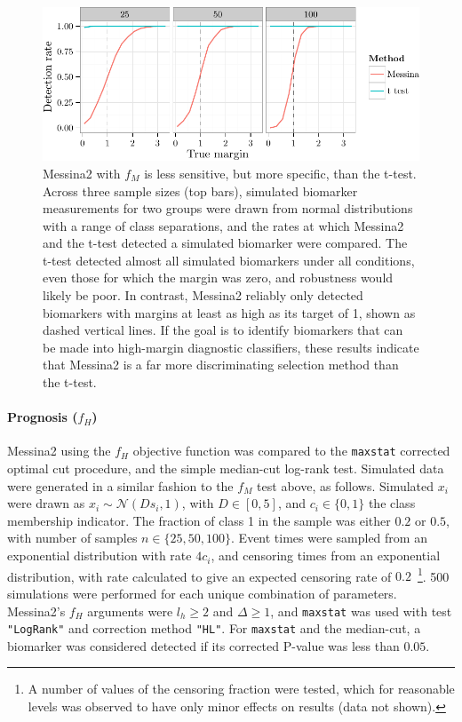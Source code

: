 \documentclass[dissertation.tex]{subfiles}
\begin{document}
\begin{figure}[!htbp]
\centering
\includegraphics[width=\linewidth]{analysis/messina/figure/06-E2A-E2A-plots-1}
\caption[Messina2 $f_M$ selects only desired biomarkers]{Messina2 with $f_M$ is less sensitive, but more specific, than the t-test.  Across three sample sizes (top bars), simulated biomarker measurements for two groups were drawn from normal distributions with a range of class separations, and the rates at which Messina2 and the t-test detected a simulated biomarker were compared.  The t-test detected almost all simulated biomarkers under all conditions, even those for which the margin was zero, and robustness would likely be poor.  In contrast, Messina2 reliably only detected biomarkers with margins at least as high as its target of 1, shown as dashed vertical lines.  If the goal is to identify biomarkers that can be made into high-margin diagnostic classifiers, these results indicate that Messina2 is a far more discriminating selection method than the t-test.}\label{fig:mess-vs-t}
\end{figure}

\paragraph{Prognosis ($f_H$)}
Messina2 using the $f_H$ objective function was compared to the \texttt{maxstat} corrected optimal cut procedure, and the simple median-cut log-rank test.  Simulated data were generated in a similar fashion to the $f_M$ test above, as follows.  Simulated $x_i$ were drawn as $x_i \sim \mathcal{N}(D s_i, 1)$, with $D \in [0, 5]$, and $c_i \in \{0, 1\}$ the class membership indicator.  The fraction of class 1 in the sample was either $0.2$ or $0.5$, with number of samples $n \in \{25, 50, 100\}$.  Event times were sampled from an exponential distribution with rate $4 c_i$, and censoring times from an exponential distribution, with rate calculated to give an expected censoring rate of $0.2$~\footnote{A number of values of the censoring fraction were tested, which for reasonable levels was observed to have only minor effects on results (data not shown).}.  500 simulations were performed for each unique combination of parameters.  Messina2's $f_H$ arguments were $l_h \geq 2$ and $\Delta \geq 1$, and \texttt{maxstat} was used with test \texttt{"LogRank"} and correction method \texttt{"HL"}.  For \texttt{maxstat} and the median-cut, a biomarker was considered detected if its corrected P-value was less than $0.05$.
\end{document}
